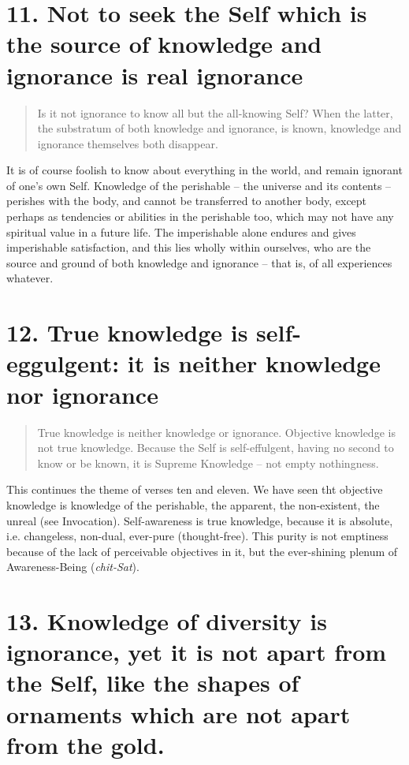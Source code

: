 \documentclass[12pt]{report}
\begin{document}
\section{11. Not to seek the Self which is the source of knowledge and
ignorance is real ignorance}

\begin{quote}
  Is it not ignorance to know all but the all-knowing Self? When the
  latter, the substratum of both knowledge and ignorance, is known,
  knowledge and ignorance themselves both disappear.
\end{quote}


It is of course foolish to know about everything in the world, and
remain ignorant of one's own Self. Knowledge of the perishable -- the
universe and its contents -- perishes with the body, and cannot be
transferred to another body, except perhaps as tendencies or abilities
in the perishable too, which may not have any spiritual value in a
future life. The imperishable alone endures and gives imperishable
satisfaction, and this lies wholly within ourselves, who are the
source and ground of both knowledge and ignorance -- that is, of all
experiences whatever.

\section{12. True knowledge is self-eggulgent: it is neither knowledge
nor ignorance}

\begin{quote}
  True knowledge is neither knowledge or ignorance. Objective knowledge
  is not true knowledge. Because the Self is self-effulgent, having no
  second to know or be known, it is Supreme Knowledge -- not empty
  nothingness.
\end{quote}


This continues the theme of verses ten and eleven. We have seen tht
objective knowledge is knowledge of the perishable, the apparent, the
non-existent, the unreal (see Invocation). Self-awareness is true
knowledge, because it is absolute, i.e. changeless, non-dual,
ever-pure (thought-free). This purity is not emptiness because of the
lack of perceivable objectives in it, but the ever-shining plenum of
Awareness-Being (\emph{chit-Sat}).

\section{13. Knowledge of diversity is ignorance, yet it is not apart
  from the Self, like the shapes of ornaments which are not apart from
the gold.}
\end{document}
